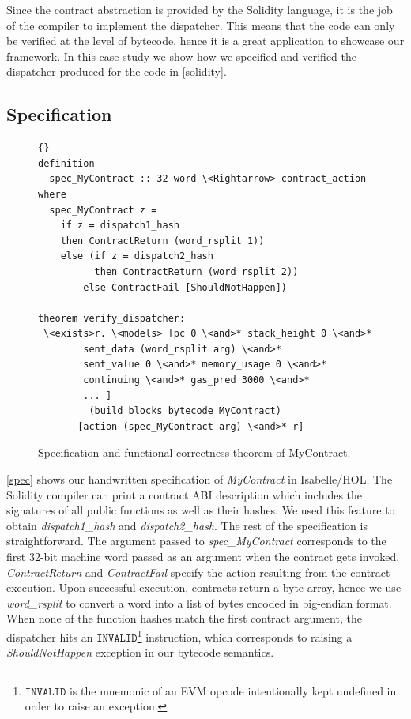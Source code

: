 \documentclass[sigplan,10pt,review]{acmart}\settopmatter{printfolios=true,printccs=false,printacmref=false}
\newcommand{\instr}[1]{\mathtt{#1}}
\begin{document}
Since the contract abstraction is provided by the Solidity language,
it is the job of the compiler to implement the dispatcher.
This means that the code can only be verified at the level of bytecode,
hence it is a great application to showcase our framework.
In this case study we show how we specified and verified the
dispatcher produced for the code in \autoref{solidity}.
%

\subsection{Specification}

\begin{figure}[h]
\begin{lstlisting}[language=Isar]{}
definition 
  spec_MyContract :: 32 word \<Rightarrow> contract_action
where
  spec_MyContract z = 
	if z = dispatch1_hash
	then ContractReturn (word_rsplit 1))
	else (if z = dispatch2_hash
	      then ContractReturn (word_rsplit 2))
        else ContractFail [ShouldNotHappen])

theorem verify_dispatcher:
 \<exists>r. \<models> [pc 0 \<and>* stack_height 0 \<and>*
        sent_data (word_rsplit arg) \<and>*
        sent_value 0 \<and>* memory_usage 0 \<and>*
        continuing \<and>* gas_pred 3000 \<and>* 
        ... ]
         (build_blocks bytecode_MyContract)
       [action (spec_MyContract arg) \<and>* r]
\end{lstlisting}
\caption{Specification and functional correctness theorem of MyContract.}
\label{spec}
\end{figure}

\autoref{spec} shows our handwritten specification of \textit{MyContract} in Isabelle/HOL.
The Solidity compiler can print a contract ABI description which includes the
signatures of all public functions as well as their hashes.
We used this feature to obtain \textit{dispatch1\_hash} and \textit{dispatch2\_hash}.
The rest of the specification is straightforward.
The argument passed to \textit{spec\_MyContract} corresponds to the first 32-bit
machine word passed as an argument when the contract gets invoked.
\textit{ContractReturn} and \textit{ContractFail} specify the action
resulting from the contract execution.
Upon successful execution, contracts return a byte array,
hence we use \textit{word\_rsplit} to convert a word into a list of bytes
encoded in big-endian format.
When none of the function hashes match the first contract argument,
the dispatcher hits an $\instr{INVALID}$\footnote{$\instr{INVALID}$ is the mnemonic
of an EVM opcode intentionally kept undefined in order to raise an exception.} instruction,
which corresponds to raising a \textit{ShouldNotHappen} exception
in our bytecode semantics.
\end{document}
